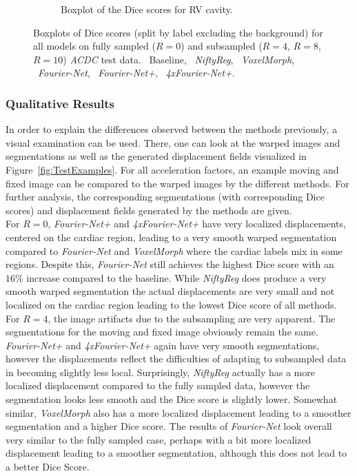 \begin{figure}[H]
\begin{subfigure}{0.83\textwidth}
    		\caption{Boxplot of the Dice scores for RV cavity.} %
    		\label{fig:Boxplot_DiceScores_RV-Cavity}
	\end{subfigure}
	\caption{Boxplots of Dice scores (split by label excluding the background) for all models on fully sampled ($R=0$) and subsampled ($R=4$, $R=8$, $R=10$) \emph{ACDC} test data. ~Baseline, ~\emph{NiftyReg}, ~\emph{VoxelMorph}, ~\emph{Fourier-Net}, ~\emph{Fourier-Net+}, ~\emph{4xFourier-Net+}.}
	\label{fig:Boxplots_DiceScores}
\end{figure}


\subsubsection{Qualitative Results}
In order to explain the differences observed between the methods previously, a visual examination can be used. There, one can look at the warped images and segmentations as well as the generated displacement fields visualized in Figure~\ref{fig:TestExamples}. For all acceleration factors, an example moving and fixed image can be compared to the warped images by the different methods. For further analysis, the corresponding segmentations (with corresponding Dice scores) and displacement fields generated by the methods are given.\\
For $R=0$, \emph{Fourier-Net+} and \emph{4xFourier-Net+} have very localized displacements, centered on the cardiac region, leading to a very smooth warped segmentation compared to \emph{Fourier-Net} and \emph{VoxelMorph} where the cardiac labels mix in some regions. Despite this, \emph{Fourier-Net} still achieves the highest Dice score with an $16\%$ increase compared to the baseline. While \emph{NiftyReg} does produce a very smooth warped segmentation the actual displacements are very small and not localized on the cardiac region leading to the lowest Dice score of all methods.\\
For $R=4$, the image artifacts due to the subsampling are very apparent. The segmentations for the moving and fixed image obviously remain the same.
\emph{Fourier-Net+} and \emph{4xFourier-Net+} again have very smooth segmentations, however the displacements reflect the difficulties of adapting to subsampled data in becoming slightly less local. Surprisingly, \emph{NiftyReg} actually has a more localized displacement compared to the fully sampled data, however the segmentation looks less smooth and the Dice score is slightly lower. Somewhat similar, \emph{VoxelMorph} also has a more localized displacement leading to a smoother segmentation and a higher Dice score. The results of \emph{Fourier-Net} look overall very similar to the fully sampled case, perhaps with a bit more localized displacement leading to a smoother segmentation, although this does not lead to a better Dice Score.\\
